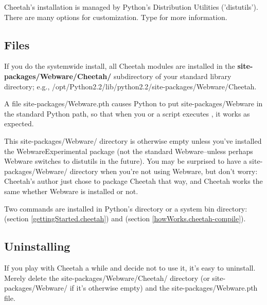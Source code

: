 Cheetah's installation is managed by Python's Distribution Utilities
('distutils').  There are many options for customization.  Type  for more information.

\subsection{Files}
\label{gettingstarted.files}

If you do the systemwide install, all Cheetah modules are installed in the
{\bf site-packages/Webware/Cheetah/} subdirectory of your standard library
directory; e.g., /opt/Python2.2/lib/python2.2/site-packages/Webware/Cheetah.

A file site-packages/Webware.pth causes Python to put 
site-packages/Webware in the standard Python path, so that when you or a
script executes , it works as
expected.

This site-packages/Webware/ directory is otherwise empty unless you've 
installed the WebwareExperimental package (not the standard Webware--unless
perhaps Webware switches to distutils in the future).  You may be surprised to
have a site-packages/Webware/ directory when you're not using Webware, but
don't worry: Cheetah's author just chose to package Cheetah that way, and
Cheetah works the same whether Webware is installed or not.

Two commands are installed in Python's  directory or a system
bin directory:  (section \ref{gettingStarted.cheetah}) and
 (section \ref{howWorks.cheetah-compile}).  

\subsection{Uninstalling}
\label{gettingstarted.uninstalling}


If you play with Cheetah a while and decide not to use it, it's easy to
uninstall.  Merely delete the site-packages/Webware/Cheetah/ directory
(or site-packages/Webware/ if it's otherwise empty) and the
site-packages/Webware.pth file.



